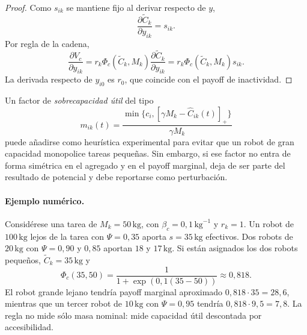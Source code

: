\begin{proof}
Como $s_{ik}$ se mantiene fijo al derivar respecto de $y$,
\[
  \frac{\partial \widetilde C_k}{\partial y_{ik}}=s_{ik}.
\]
Por regla de la cadena,
\[
  \frac{\partial V_c}{\partial y_{ik}}
  =
  r_k\Phi_c(\widetilde C_k,M_k)
  \frac{\partial \widetilde C_k}{\partial y_{ik}}
  =
  r_k\Phi_c(\widetilde C_k,M_k)s_{ik}.
\]
La derivada respecto de $y_{i0}$ es $r_0$, que coincide con el payoff de inactividad.
\end{proof}

Un factor de \emph{sobrecapacidad útil} del tipo
\[
  m_{ik}(t)=
  \frac{\min\{c_i,[\gamma M_k-\widehat C_{ik}(t)]_+\}}{\gamma M_k}
\]
puede añadirse como heurística experimental para evitar que un robot de gran capacidad
monopolice tareas pequeñas. Sin embargo, si ese factor no entra de forma simétrica en
el agregado y en el payoff marginal, deja de ser parte del resultado de potencial y debe
reportarse como perturbación.

\paragraph{Ejemplo numérico.}
Considérese una tarea de $M_k=50\,\mathrm{kg}$, con $\beta_c=0{,}1\,\mathrm{kg}^{-1}$ y
$r_k=1$. Un robot de $100\,\mathrm{kg}$ lejos de la tarea con $\Psi=0{,}35$ aporta
$s=35\,\mathrm{kg}$ efectivos. Dos robots de $20\,\mathrm{kg}$ con $\Psi=0{,}90$ y
$0{,}85$ aportan $18$ y $17\,\mathrm{kg}$. Si están asignados los dos robots pequeños,
$\widetilde C_k=35\,\mathrm{kg}$ y
\[
  \Phi_c(35,50)=\frac{1}{1+\exp(0{,}1(35-50))}\approx0{,}818.
\]
El robot grande lejano tendría payoff marginal aproximado $0{,}818\cdot35=28{,}6$,
mientras que un tercer robot de $10\,\mathrm{kg}$ con $\Psi=0{,}95$ tendría
$0{,}818\cdot9{,}5=7{,}8$. La regla no mide sólo masa nominal: mide capacidad útil
descontada por accesibilidad.

